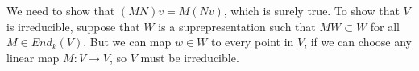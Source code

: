 
We need to show that $(MN)v=M(Nv)$, which is surely true. To show that $V$ is irreducible, suppose that $W$ is a suprepresentation such that $MW \subset W$ for all $M \in End_k(V)$. But we can map $w \in W$ to every point in $V$, if we can choose any linear map $M: V \to V$, so $V$ must be irreducible.